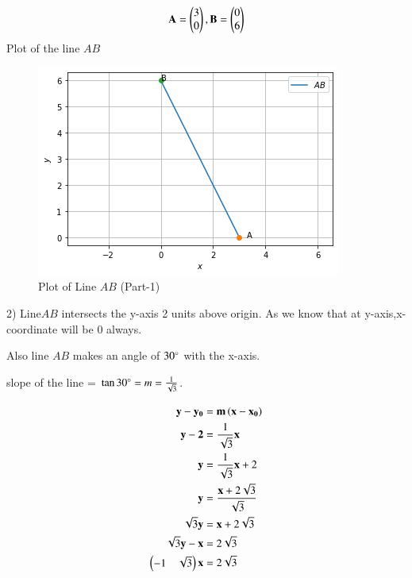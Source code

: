 \documentclass[journal,12pt,twocolumn]{IEEEtran}
\begin{document}
\begin{align}
\mathbf{A} = \begin{pmatrix}3\\0\end{pmatrix},\mathbf{B} = \begin{pmatrix}0\\6\end{pmatrix} 
\end{align}
Plot of the line $AB$
\begin{figure}[ht]
\centering
\includegraphics[width=\columnwidth]{Line_Plot_Part-1.PNG}
\caption{Plot of Line $AB$ (Part-1)}
\label{Plot of Line $AB$ (Part-1)}
\end{figure}

2) Line$AB$ intersects the y-axis 2 units above origin.
As we know that at y-axis,x-coordinate will be 0 always.

Also line $AB$ makes an angle of $30\degree$ with the x-axis.

slope of the line = $\tan30\degree =m = \frac{1}{\sqrt{3}}$.

\begin{align}
\label{eq:line_norm_dir}
\mathbf{y}-\mathbf{y_0} &= \mathbf{m}\left(\mathbf{x}-\mathbf{x_0}\right)
\\
\mathbf{y}-\mathbf{2} &= \frac{1}{\sqrt{3}}\mathbf{x}
\\
\mathbf{y} &= \frac{1}{\sqrt{3}}\mathbf{x}+2
\\
\mathbf{y} &= \frac{\mathbf{x}+2\sqrt{3}}{\sqrt{3}}
\\
\sqrt{3}\mathbf{y} &= \mathbf{x}+2\sqrt{3}
\\
\sqrt{3}\mathbf{y}-\mathbf{x} &= 2\sqrt{3}
\\
\begin{pmatrix}-1 & \sqrt{3}\end{pmatrix}\mathbf{x} &= 2\sqrt{3}
\end{align}
\end{document}
